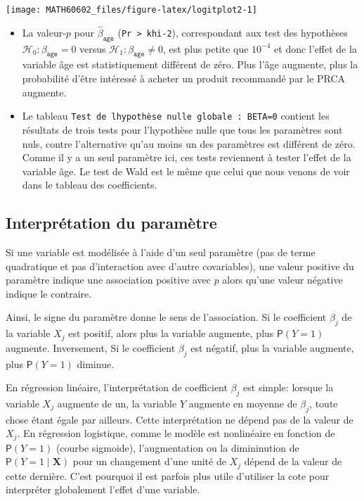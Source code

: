 \documentclass[
  11pt,
  letterpaper,
]{book}
\providecommand{\tightlist}{%
  \setlength{\itemsep}{0pt}\setlength{\parskip}{0pt}}
\theoremstyle{definition}
\theoremstyle{definition}
\theoremstyle{definition}
\theoremstyle{remark}
\begin{document}
\begin{center}\texttt{[image: MATH60602\_files/figure-latex/logitplot2-1]} \end{center}

\begin{itemize}
\tightlist
\item
  La valeur-\(p\) pour \(\widehat{\beta}_{\texttt{age}}\) (\texttt{Pr\ \textgreater{}\ khi-2}), correspondant aux test des hypothèses \(\mathcal{H}_0: \beta_{\texttt{age}}=0\) versus \(\mathcal{H}_1: \beta_{\texttt{age}} \neq 0\), est plus petite que \(10^{-4}\) et donc l'effet de la variable âge est statistiquement différent de zéro. Plus l'âge augmente, plus la probabilité d'être intéressé à acheter un produit recommandé par le PRCA augmente.
\item
  Le tableau \texttt{Test\ de\ l\textquotesingle{}hypothèse\ nulle\ globale\ :\ BETA=0} contient les résultats de trois tests pour l'hypothèse nulle que tous les paramètres sont nuls, contre l'alternative qu'au moins un des paramètres est différent de zéro. Comme il y a un seul paramètre ici, ces tests reviennent à tester l'effet de la variable âge. Le test de Wald est le même que celui que nous venons de voir dans le tableau des coefficients.
\end{itemize}

\hypertarget{interpruxe9tation-du-paramuxe8tre}{%
\subsection{Interprétation du paramètre}\label{interpruxe9tation-du-paramuxe8tre}}

Si une variable est modélisée à l'aide d'un seul paramètre (pas de terme quadratique et pas d'interaction avec d'autre covariables), une valeur positive du paramètre indique une association positive avec \(p\) alors qu'une valeur négative indique le contraire.

Ainsi, le signe du paramètre donne le sens de l'association. Si le coefficient \(\beta_j\) de la variable \(X_j\) est positif, alors plus la variable augmente, plus \({\mathsf P}\left(Y=1\right)\) augmente. Inversement, Si le coefficient \(\beta_j\) est négatif, plus la variable augmente, plus \({\mathsf P}\left(Y=1\right)\) diminue.

En régression linéaire, l'interprétation de coefficient \(\beta_j\) est simple: lorsque la variable \(X_j\) augmente de un, la variable \(Y\) augmente en moyenne de \(\beta_j\), toute chose étant égale par ailleurs. Cette interprétation ne dépend pas de la valeur de \(X_j\). En régression logistique, comme le modèle est nonlinéaire en fonction de \({\mathsf P}\left(Y=1\right)\) (courbe sigmoide), l'augmentation ou la dimininution de \({\mathsf P}\left(Y=1\mid \boldsymbol{X}\right)\) pour un changement d'une unité de \(X_j\) dépend de la valeur de cette dernière. C'est pourquoi il est parfois plus utile d'utiliser la cote pour interpréter globalement l'effet d'une variable.
\end{document}
